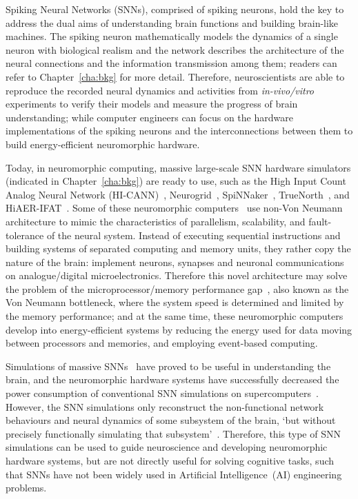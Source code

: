 Spiking Neural Networks (SNNs), comprised of spiking neurons, hold the key to address the dual aims of understanding brain functions and building brain-like machines.
The spiking neuron mathematically models the dynamics of a single neuron with biological realism and the network describes the architecture of the neural connections and the information transmission among them; readers can refer to Chapter~\ref{cha:bkg} for more detail.
Therefore, neuroscientists are able to reproduce the recorded neural dynamics and activities from \textit{in-vivo/vitro} experiments to verify their models and measure the progress of brain understanding;
while computer engineers can focus on the hardware implementations of the spiking neurons and the interconnections between them to build energy-efficient neuromorphic hardware.

Today, in neuromorphic computing, massive large-scale SNN hardware simulators (indicated in Chapter~\ref{cha:bkg}) are ready to use, such as the High Input Count Analog Neural Network (HI-CANN)~\citep{schemmel2010wafer}, Neurogrid~\citep{benjamin2014neurogrid}, SpiNNaker~\citep{furber2014spinnaker}, TrueNorth~\citep{merolla2014million}, and HiAER-IFAT~\citep{yu201265k}.
Some of these neuromorphic computers~\citep{schemmel2010wafer,benjamin2014neurogrid,merolla2014million} use non-Von Neumann architecture to mimic the characteristics of parallelism, scalability, and fault-tolerance of the neural system.
Instead of executing sequential instructions and building systems of separated computing and memory units, they rather copy the nature of the brain: implement neurons, synapses and neuronal communications on analogue/digital microelectronics.
Therefore this novel architecture may solve the problem of the microprocessor/memory performance gap~\citep{wulf1995hitting}, also known as the Von Neumann bottleneck, where the system speed is determined and limited by the memory performance;
and at the same time, these neuromorphic computers develop into energy-efficient systems by reducing the energy used for data moving between processors and memories, and employing event-based computing. 



Simulations of massive SNNs~\citep{markram2006blue,ananthanarayanan2009cat} have proved to be useful in understanding the brain, and the neuromorphic hardware systems have successfully decreased the power consumption of conventional SNN simulations on supercomputers~\citep{de2010world,sharp2012power}.
However, the SNN simulations only reconstruct the non-functional network behaviours and neural dynamics of some subsystem of the brain, `but without precisely functionally simulating that subsystem'~\citep{de2010world}.
Therefore, this type of SNN simulations can be used to guide neuroscience and developing neuromorphic hardware systems, but are not directly useful for solving cognitive tasks, such that SNNs have not been widely used in Artificial Intelligence~(AI) engineering problems.



